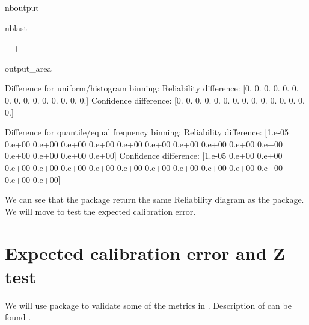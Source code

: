 \documentclass[letterpaper,10pt,english]{sphinxmanual}
\begin{document}
\begin{sphinxuseclass}{nboutput}
\begin{sphinxuseclass}{nblast}
{

\kern-\sphinxverbatimsmallskipamount\kern-\baselineskip
\kern+\FrameHeightAdjust\kern-\fboxrule
\vspace{\nbsphinxcodecellspacing}

\begin{sphinxuseclass}{output_area}
\begin{sphinxuseclass}{}


\begin{sphinxVerbatim}[commandchars=\\\{\}]
Difference for uniform/histogram binning:
Reliability difference: [0. 0. 0. 0. 0. 0. 0. 0. 0. 0. 0. 0. 0. 0. 0.]
Confidence difference: [0. 0. 0. 0. 0. 0. 0. 0. 0. 0. 0. 0. 0. 0. 0.]

Difference for quantile/equal frequency binning:
Reliability difference: [1.e-05 0.e+00 0.e+00 0.e+00 0.e+00 0.e+00 0.e+00 0.e+00 0.e+00 0.e+00
 0.e+00 0.e+00 0.e+00 0.e+00 0.e+00]
Confidence difference: [1.e-05 0.e+00 0.e+00 0.e+00 0.e+00 0.e+00 0.e+00 0.e+00 0.e+00 0.e+00
 0.e+00 0.e+00 0.e+00 0.e+00 0.e+00]
\end{sphinxVerbatim}



\end{sphinxuseclass}
\end{sphinxuseclass}
}

\end{sphinxuseclass}
\end{sphinxuseclass}
\sphinxAtStartPar
We can see that the  package return the same Reliability diagram as the  package. We will move to test the expected calibration error.


\section{Expected calibration error and Z test}
\label{\detokenize{notebooks/validation:Expected-calibration-error-and-Z-test}}
\sphinxAtStartPar
We will use  package to validate some of the metrics in . Description of  can be found .
\end{document}
